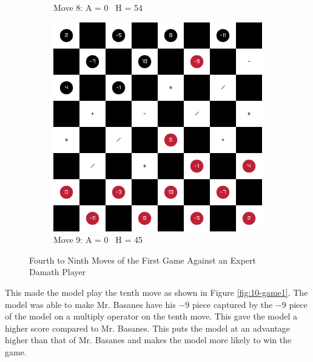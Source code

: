\begin{figure}[H]
\begin{subfigure}{0.3\textwidth}
        \caption*{Move 8: A = 0 \textbar\ H = 54}
    \end{subfigure}
    \quad
    \begin{subfigure}{0.3\textwidth}
        \centering
        \includegraphics[width=\textwidth]{images/games/game1/move_10.png}
        \caption*{Move 9: A = 0 \textbar\ H = 45}
    \end{subfigure}
    \caption{Fourth to Ninth Moves of the First Game Against an Expert Damath Player} %
    \label{fig:4-9-game1}
\end{figure}

This made the model play the tenth move as shown in Figure \ref{fig:10-game1}. The model was able to make Mr. Basanes have his $-9$ piece captured by the $-9$ piece of the model on a multiply operator on the tenth move. This gave the model a higher score compared to Mr. Basanes. This puts the model at an advantage higher than that of Mr. Basanes and makes the model more likely to win the game.

